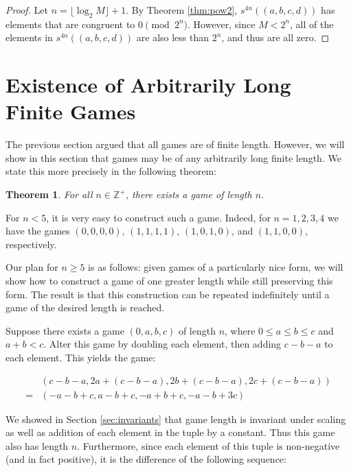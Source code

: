 \documentclass[12pt]{amsart}
\newtheorem{theorem}{Theorem}[section]
\newcommand{\diff}{s}
\newcommand{\zp}{\mathbb{Z}^+}
\begin{document}
\begin{proof}
Let $n = \lfloor\log_2{M}\rfloor + 1$. By Theorem \ref {thm:pow2}, $\diff^{4n}((a, b, c, d))$ has elements that are congruent to $0\pmod{2^n}$. However, since $M < 2^n$, all of the elements in $\diff^{4n}((a, b, c, d))$ are also less than $2^n$, and thus are all zero.
\end{proof}

\section{Existence of Arbitrarily Long Finite Games\label{sec:longgames}}

The previous section argued that all games are of finite length. However, we will show in this section that games may be of any arbitrarily long finite length. We state this more precisely in the following theorem:

\begin{theorem}
For all $n\in \zp$, there exists a game of length $n$.
\end{theorem}

For $n < 5$, it is very easy to construct such a game. Indeed, for $n=1,2,3,4$ we have the games $(0, 0, 0, 0)$, $(1, 1, 1, 1)$, $(1, 0, 1, 0)$, and $(1, 1, 0, 0)$, respectively.

Our plan for $n \geq 5$ is as follows: given games of a particularly nice form, we will show how to construct a game of one greater length while still preserving this form. The result is that this construction can be repeated indefinitely until a game of the desired length is reached.

Suppose there exists a game $(0, a, b, c)$ of length $n$, where $0\leq a\leq b\leq c$ and $a + b < c$. Alter this game by doubling each element, then adding $c - b - a$ to each element. This yields the game:

$$\begin{array}{cl}
& (c - b - a, 2a + (c - b - a), 2b + (c - b - a), 2c + (c - b - a)) \\
= & (-a - b + c, a - b + c, -a + b + c, -a - b + 3c)
\end{array}$$

We showed in Section \ref{sec:invariants} that game length is invariant under scaling as well as addition of each element in the tuple by a constant. Thus this game also has length $n$. Furthermore, since each element of this tuple is non-negative (and in fact positive), it is the difference of the following sequence:
\end{document}
